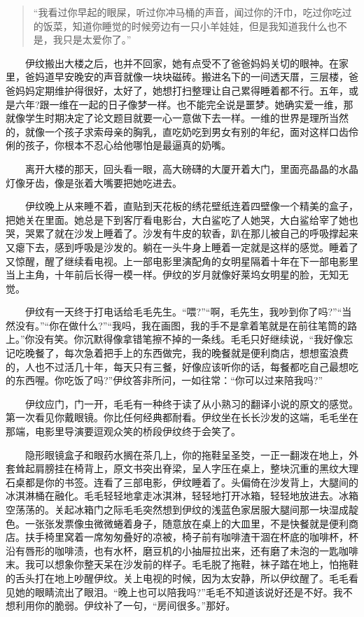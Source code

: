 \documentclass[12pt,UTF8]{ctexbook}
\begin{document}
\begin{quote}
\enquote{我看过你早起的眼屎，听过你冲马桶的声音，闻过你的汗巾，吃过你吃过的饭菜，知道你睡觉的时候旁边有一只小羊娃娃，但是我知道我什么也不是，我只是太爱你了。}
\end{quote}

　　伊纹搬出大楼之后，也并不回家，她有点受不了爸爸妈妈关切的眼神。在家里，爸妈道早安晚安的声音就像一块块磁砖。搬进名下的一间透天厝，三层楼，爸爸妈妈定期维护得很好，太好了，她想打扫整理让自己累得睡着都不行。五年，或是六年?跟一维在一起的日子像梦一样。也不能完全说是噩梦。她确实爱一维，那就像学生时期决定了论文题目就要一心一意做下去一样。一维的世界是理所当然的，就像一个孩子求索母亲的胸乳，直吃奶吃到男女有别的年纪，面对这样口齿伶俐的孩子，你根本不忍心给他哪怕是最逼真的奶嘴。

　　离开大楼的那天，回头看一眼，高大磅礴的大厦开着大门，里面亮晶晶的水晶灯像牙齿，像是张着大嘴要把她吃进去。

　　伊纹晚上从来睡不着，直贴到天花板的绣花壁纸连着四壁像一个精美的盒子，把她关在里面。她总是下到客厅看电影台，大白鲨吃了人她哭，大白鲨给宰了她也哭，哭累了就在沙发上睡着了。沙发有牛皮的软香，趴在那儿被自己的呼吸撑起来又瘪下去，感到呼吸是沙发的。躺在一头牛身上睡着一定就是这样的感觉。睡着了又惊醒，醒了继续看电视。上一部电影里演配角的女明星隔着十年在下一部电影里当上主角，十年前后长得一模一样。伊纹的岁月就像好莱坞女明星的脸，无知无觉。

　　伊纹有一天终于打电话给毛毛先生。\enquote{喂?}\enquote{啊，毛先生，我吵到你了吗?}\enquote{当然没有。}\enquote{你在做什么?}\enquote{我吗，我在画图，我的手不是拿着笔就是在前往笔筒的路上。}你没有笑。你沉默得像拿错笔擦不掉的一条线。毛毛只好继续说，\enquote{我好像忘记吃晚餐了，每次急着把手上的东西做完，我的晚餐就是便利商店，想想蛮浪费的，人也不过活几十年，每天只有三餐，好像应该听你的话，每餐都吃自己最想吃的东西喔。你吃饭了吗?}伊纹答非所问，一如往常：\enquote{你可以过来陪我吗?}

　　伊纹应门，门一开，毛毛有一种终于读了从小熟习的翻译小说的原文的感觉。第一次看见你戴眼镜。你比任何经典都耐看。伊纹坐在长长沙发的这端，毛毛坐在那端，电影里导演要逗观众笑的桥段伊纹终于会笑了。

　　隐形眼镜盒子和眼药水搁在茶几上，你的拖鞋呈圣筊，一正一翻泼在地上，外套耸起肩膀挂在椅背上，原文书突出脊梁，呈人字压在桌上，整块沉重的黑纹大理石桌都是你的书签。连看了三部电影，伊纹睡着了。头偏倚在沙发背上，大腿间的冰淇淋桶在融化。毛毛轻轻地拿走冰淇淋，轻轻地打开冰箱，轻轻地放进去。冰箱空荡荡的。关起冰箱门之际毛毛突然想到伊纹的浅蓝色家居服大腿间那一块湿成靛色。一张张发票像虫微微蜷着身子，随意放在桌上的大皿里，不是快餐就是便利商店。扶手椅里窝着一席匆匆叠好的凉被，椅子前有咖啡渣干涸在杯底的咖啡杯，杯沿有唇形的咖啡渍，也有水杯，磨豆机的小抽屉拉出来，还有磨了未泡的一匙咖啡末。我可以想象你整天呆在沙发前的样子。毛毛脱了拖鞋，袜子踏在地上，怕拖鞋的舌头打在地上吵醒伊纹。关上电视的时候，因为太安静，所以伊纹醒了。毛毛看见她的眼睛流出了眼泪。\enquote{晚上也可以陪我吗?}毛毛不知道该说好还是不好。我不想利用你的脆弱。伊纹补了一句，\enquote{房间很多。}那好。
\end{document}
